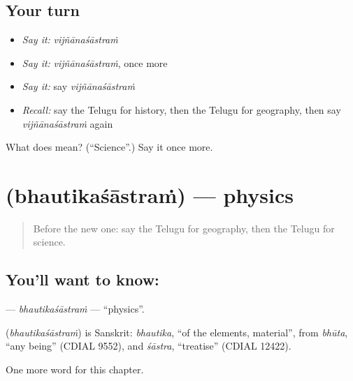 \subsection*{Your turn}
\begin{itemize}
\raggedright
  \item \emph{Say it:} \emph{vijñānaśāstraṁ}
  \item \emph{Say it:} \emph{vijñānaśāstraṁ}, once more
  \item \emph{Say it:} say \emph{vijñānaśāstraṁ}
  \item \emph{Recall:} say the Telugu for history, then the Telugu for geography, then say \emph{vijñānaśāstraṁ} again
\end{itemize}

\begin{tcolorbox}[breakable,colback=teal!4,colframe=teal!35!black,title={Before you move on}]
What does  mean? (\textquotedblleft{}Science\textquotedblright{}.) Say it once more.
\end{tcolorbox}
\section[\texorpdfstring{\te{భౌతికశాస్త్రం} (bhautikaśāstraṁ)}{భౌతికశాస్త్రం (bhautikaśāstraṁ)}]{ (bhautikaśāstraṁ) — physics}

\label{lesson:TE-C238-bhautikasastram}



\begin{quote}
Before the new one: say the Telugu for geography, then the Telugu for science.
\end{quote}

\subsection*{You'll want to know: }
\textbf{} — \emph{bhautikaśāstraṁ} — \textquotedblleft{}physics\textquotedblright{}.

\begin{cousinweb}
\textbf{} (\emph{bhautikaśāstraṁ}) is Sanskrit: \emph{bhautika}, \textquotedblleft{}of the elements, material\textquotedblright{}, from \emph{bhūta}, \textquotedblleft{}any being\textquotedblright{} (CDIAL 9552), and \emph{śāstra}, \textquotedblleft{}treatise\textquotedblright{} (CDIAL 12422).
\end{cousinweb}

\begin{grammarlens}[title={What you've built}]
One more word for this chapter.
\end{grammarlens}

